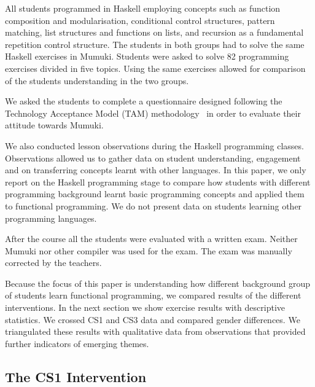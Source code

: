 
All students programmed in Haskell employing concepts such as function composition and modularisation, conditional control structures, pattern matching, list structures and functions on lists, and recursion as a fundamental repetition control structure. The students in both groups had to solve the same Haskell exercises in Mumuki. Students were asked to solve 82 programming exercises divided in five topics. Using the same exercises allowed for comparison of the students understanding in the two groups.


We asked the students to complete a questionnaire designed following the Technology Acceptance Model (TAM) methodology~\cite{Chuttur:2009} in order to evaluate their attitude towards Mumuki. 

We also conducted lesson observations during the Haskell programming classes. Observations allowed us to gather data on student understanding, engagement and on transferring concepts learnt with other languages. In this paper, we only report on the Haskell programming stage to compare how students with different programming background learnt basic programming concepts and applied them to functional programming. We do not present data on students learning other programming languages. 

After the course all the students were evaluated with a written  exam. Neither Mumuki nor other compiler was used for the exam. The exam was manually corrected by the teachers.

Because the focus of this paper is understanding how different background group of students learn functional programming, we compared results of the different interventions. In the next section we show exercise results with descriptive statistics. We crossed CS1 and CS3 data and compared gender differences. We triangulated these results with qualitative data from observations that provided further indicators of emerging themes. 

\subsection{The CS1 Intervention}

